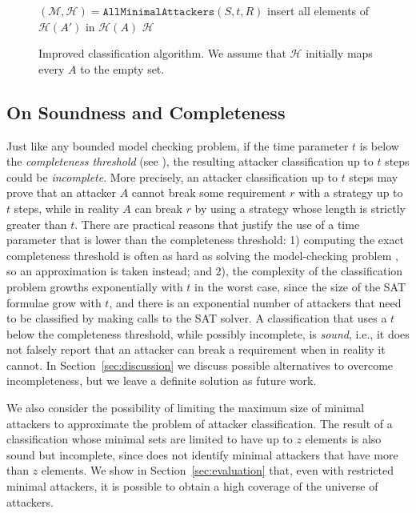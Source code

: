 {\begin{figure}[!t]
{\begin{framed}
\begin{algorithm}[H]
$(\mathcal{M},\mathcal{H})=\mathtt{AllMinimalAttackers}(S,t,R)$\;
{
	{
		{
			insert all elements of $\mathcal{H}(A')$ in $\mathcal{H}(A)$\;
		}
	 }
}
 \Return $\mathcal{H}$\;
 \caption{Improved classification algorithm. We assume that $\mathcal{H}$ initially maps every $A$ to the empty set.}
 \label{alg:GoodQuantification}
\end{algorithm}
\end{framed}}
\vspace{-0.5cm}
\end{figure}

\subsection{On Soundness and Completeness}
\label{sec:completeness}
Just like any bounded model checking problem, if the time parameter $t$ is below the \emph{completeness threshold} (see \cite{EfficientComputationOfRecurrenceDiameters}), the resulting attacker classification up to $t$ steps could be \emph{incomplete}. More precisely, an attacker classification up to $t$ steps may prove that an attacker $A$ cannot break some requirement $r$ with a strategy up to $t$ steps, while in reality $A$ can break $r$ by using a strategy whose length is strictly greater than $t$. There are practical reasons that justify the use of a time parameter that is lower than the completeness threshold: 1) computing the exact completeness threshold is often as hard as solving the model-checking problem \cite{HandbookOfModelChecking}, so an approximation is taken instead; and 2), the complexity of the classification problem growths exponentially with $t$ in the worst case, since the size of the SAT formulae grow with $t$, and there is an exponential number of attackers that need to be classified by making calls to the SAT solver. A classification that uses a $t$ below the completeness threshold, while possibly incomplete, is \emph{sound}, i.e., it does not falsely report that an attacker can break a requirement when in reality it cannot. In Section~\ref{sec:discussion} we discuss possible alternatives to overcome incompleteness, but we leave a definite solution as future work.

We also consider the possibility of limiting the maximum size of minimal attackers to approximate the problem of attacker classification. The result of a classification whose minimal sets are limited to have up to $z$ elements is also sound but incomplete, since does not identify minimal attackers that have more than $z$ elements. We show in Section~\ref{sec:evaluation} that, even with restricted minimal attackers, it is possible to obtain a high coverage of the universe of attackers.
 
}

